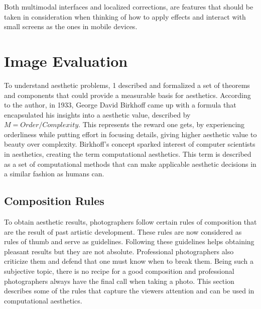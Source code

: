 Both multimodal interfaces and localized corrections, are features that should be taken in consideration when thinking of how to apply effects and interact with small screens as the ones in mobile devices.


\section{Image Evaluation}
\label{sec:photo_eval}
To understand aesthetic problems, \citeauthor{hoenig2005defining} \cite{hoenig2005defining}1 described and formalized a set of theorems and components that could provide a measurable basis for aesthetics.
According to the author, in 1933, George David Birkhoff came up with a formula that encapsulated his insights into a aesthetic value, described by $ M = Order/Complexity $. This represents the reward one gets, by experiencing orderliness while putting effort in focusing details, giving higher aesthetic value to beauty over complexity. Birkhoff's concept sparked interest of computer scientists in aesthetics, creating the term computational aesthetics. This term is described as a set of computational methods that can make applicable aesthetic decisions in a similar fashion as humans can.

\subsection{Composition Rules}
\label{sub:photo_rules}

To obtain aesthetic results, photographers follow certain rules of composition that are the result of past artistic development. These rules are now considered as rules of thumb and serve as guidelines. Following these guidelines helps obtaining pleasant results but they are not absolute. Professional photographers also criticize them and defend that one must know when to break them.
Being such a subjective topic, there is no recipe for a good composition and professional photographers always have the final call when taking a photo. This section describes some of the rules that capture the viewers attention and can be used in computational aesthetics.

